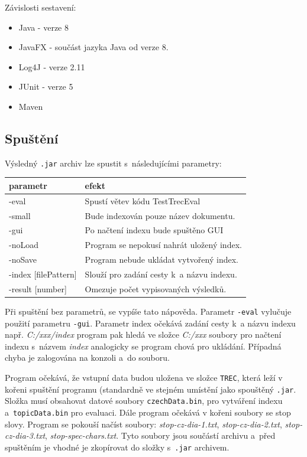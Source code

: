 \documentclass[12pt, a4paper]{article}
\begin{document}
Závislosti sestavení:
\begin{itemize}
\item Java - verze 8

\item JavaFX - součást jazyka Java od verze 8.
\item Log4J - verze 2.11

\item JUnit - verze 5  \footnotemark[1]

\item Maven \footnotemark[1]


\end{itemize}

\subsection{Spuštění}

Výsledný \texttt{.jar} archiv lze spustit s~následujícími parametry:

\begin{table}[ht!]
\centering
\begin{tabular}{l | l}
parametr & efekt\\
\hline
-eval   & Spustí větev kódu TestTrecEval\\
-small  & Bude indexován pouze název dokumentu.\\
-gui    & Po načtení indexu bude spuštěno GUI\\
-noLoad & Program se nepokusí nahrát uložený index.\\
-noSave & Program nebude ukládat vytvořený index.\\
-index [filePattern] & Slouží pro zadání cesty k~a názvu indexu.\\
-result [number] & Omezuje počet vypisovaných výsledků.\\
\end{tabular}
\end{table}

Při spuštění bez parametrů, se vypíše tato nápověda. Parametr \texttt{-eval} vylučuje použití parametru \texttt{-gui}. Parametr index očekává zadání cesty k~a názvu indexu např. \emph{C:/xxx/index} program pak hledá ve složce \emph{C:/xxx} soubory pro načtení indexu s~názvem \emph{index} analogicky se program chová pro ukládání. Případná chyba je zalogována na konzoli a~do souboru.

Program očekává, že vstupní data budou uložena ve složce \texttt{TREC}, která leží v kořeni spuštění programu (standardně ve stejném umístění jako spouštěný \texttt{.jar}. Složka musí obsahovat datové soubory \texttt{czechData.bin}, pro vytváření indexu a~\texttt{topicData.bin} pro evaluaci. Dále program očekává v kořeni soubory se stop slovy. Program se pokouší načíst soubory: \emph{stop-cz-dia-1.txt}, \emph{stop-cz-dia-2.txt}, \emph{stop-cz-dia-3.txt}, \emph{stop-spec-chars.txt}. Tyto soubory jsou součástí archivu a~před spuštěním je vhodné je zkopírovat do složky s~\texttt{.jar} archivem.
\end{document}
